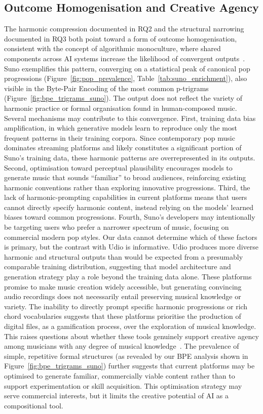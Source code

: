 \documentclass{article}
\begin{document}
\subsection{Outcome Homogenisation and Creative Agency}
\label{sec:homogenization}
The harmonic compression documented in RQ2 and the structural narrowing documented in RQ3 both point toward a form of outcome homogenisation, consistent with the concept of algorithmic monoculture, where shared components across AI systems increase the likelihood of convergent outputs~\citep{bommasani2022picking}. Suno exemplifies this pattern, converging on a statistical peak of canonical pop progressions (Figure~\ref{fig:pop_prevalence}, Table~\ref{tab:suno_enrichment}), also visible in the Byte-Pair Encoding of the most common p-trigrams (Figure~\ref{fig:bpe_trigrams_suno}). The output does not reflect the variety of harmonic practice or formal organisation found in human-composed music.
Several mechanisms may contribute to this convergence. First, training data bias amplification, in which generative models learn to reproduce only the most frequent patterns in their training corpora. Since contemporary pop music dominates streaming platforms and likely constitutes a significant portion of Suno's training data, these harmonic patterns are overrepresented in its outputs. Second, optimisation toward perceptual plausibility encourages models to generate music that sounds ``familiar'' to broad audiences, reinforcing existing harmonic conventions rather than exploring innovative progressions. Third, the lack of harmonic-prompting capabilities in current platforms means that users cannot directly specify harmonic content, instead relying on the models' learned biases toward common progressions. Fourth, Suno's developers may intentionally be targeting users who prefer a narrower spectrum of music, focusing on commercial modern pop styles.
Our data cannot determine which of these factors is primary, but the contrast with Udio is informative. Udio produces more diverse harmonic and structural outputs than would be expected from a presumably comparable training distribution, suggesting that model architecture and generation strategy play a role beyond the training data alone.
These platforms promise to make music creation widely accessible, but generating convincing audio recordings does not necessarily entail preserving musical knowledge or variety. The inability to directly prompt specific harmonic progressions or rich chord vocabularies suggests that these platforms prioritise the production of digital files, as a gamification process, over the exploration of musical knowledge. This raises questions about whether these tools genuinely support creative agency among musicians with any degree of musical knowledge~\citep{wiggins2007compositional, wiggins2016musical, lin2023beyond, tan2024we}. The prevalence of simple, repetitive formal structures (as revealed by our BPE analysis shown in Figure~\ref{fig:bpe_trigrams_suno}) further suggests that current platforms may be optimised to generate familiar, commercially viable content rather than to support experimentation or skill acquisition. This optimisation strategy may serve commercial interests, but it limits the creative potential of AI as a compositional tool.
\end{document}
